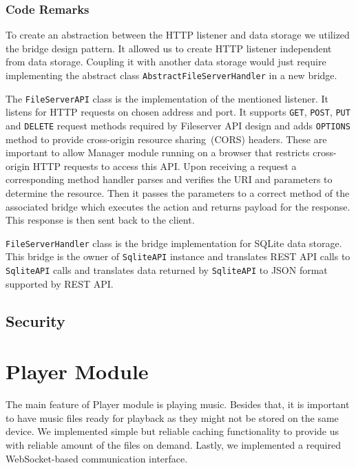 \subsubsection{Code Remarks}
To create an abstraction between the HTTP listener and data storage we utilized the bridge design pattern. It allowed us to create HTTP listener independent from data storage. Coupling it with another data storage would just require implementing the abstract class \texttt{AbstractFileServerHandler} in a new bridge.
\par
The \texttt{FileServerAPI} class is the implementation of the mentioned listener. It listens for HTTP requests on chosen address and port. It supports \texttt{GET}, \texttt{POST}, \texttt{PUT} and \texttt{DELETE} request methods required by Fileserver API design and adds \texttt{OPTIONS} method to provide cross-origin resource sharing~(CORS) headers. These are important to allow Manager module running on a browser that restricts cross-origin HTTP requests to access this API. Upon receiving a request a corresponding method handler parses and verifies the URI and parameters to determine the resource. Then it passes the parameters to a correct method of the associated bridge which executes the action and returns payload for the response. This response is then sent back to the client.
\par
\texttt{FileServerHandler} class is the bridge implementation for SQLite data storage. This bridge is the owner of \texttt{SqliteAPI} instance and translates REST API calls to \texttt{SqliteAPI} calls and translates data returned by \texttt{SqliteAPI} to JSON format supported by REST API.

\subsection{Security}

\section{Player Module}

The main feature of Player module is playing music. Besides that, it is important to have music files ready for playback as they might not be stored on the same device. We implemented simple but reliable caching functionality to provide us with reliable amount of the files on demand. Lastly, we implemented a required WebSocket-based communication interface.

